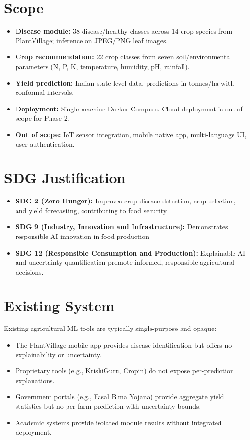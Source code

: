 \documentclass[12pt,a4paper]{report}
\begin{document}
\section{Scope}
\begin{itemize}[leftmargin=*]
  \item \textbf{Disease module:} 38 disease/healthy classes across 14 crop species from PlantVillage; inference on JPEG/PNG leaf images.
  \item \textbf{Crop recommendation:} 22 crop classes from seven soil/environmental parameters (N, P, K, temperature, humidity, pH, rainfall).
  \item \textbf{Yield prediction:} Indian state-level data, predictions in tonnes/ha with conformal intervals.
  \item \textbf{Deployment:} Single-machine Docker Compose. Cloud deployment is out of scope for Phase 2.
  \item \textbf{Out of scope:} IoT sensor integration, mobile native app, multi-language UI, user authentication.
\end{itemize}

\section{SDG Justification}
\begin{itemize}[leftmargin=*]
  \item \textbf{SDG 2 (Zero Hunger):} Improves crop disease detection, crop selection, and yield forecasting, contributing to food security.
  \item \textbf{SDG 9 (Industry, Innovation and Infrastructure):} Demonstrates responsible AI innovation in food production.
  \item \textbf{SDG 12 (Responsible Consumption and Production):} Explainable AI and uncertainty quantification promote informed, responsible agricultural decisions.
\end{itemize}

\section{Existing System}
Existing agricultural ML tools are typically single-purpose and opaque:
\begin{itemize}[leftmargin=*]
  \item The PlantVillage mobile app provides disease identification but offers no explainability or uncertainty.
  \item Proprietary tools (e.g., KrishiGuru, Cropin) do not expose per-prediction explanations.
  \item Government portals (e.g., Fasal Bima Yojana) provide aggregate yield statistics but no per-farm prediction with uncertainty bounds.
  \item Academic systems \cite{mohanty2016using, pudumalar2017crop, khaki2020crop} provide isolated module results without integrated deployment.
\end{itemize}
\end{document}
